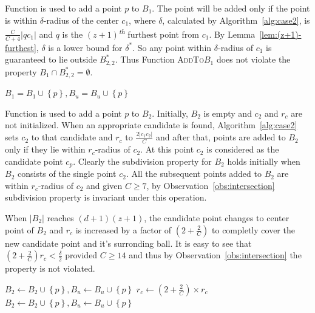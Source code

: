 \documentclass[envcountsame]{cls/cccg15}
\newcommand{\nth}{\textsuperscript{\textit{th}} }
\newcommand{\set}[1]{\left\{ #1 \right\}}
\newcommand{\card}[1]{\left|{#1}\right|}
\newcommand{\gee}{\geqslant}
\renewcommand{\ge}{\gee}
\begin{document}
Function  is used to add a point $p$ to $B_1$. The point will be added only if the point is within $\delta$\nobreakdash-radius of the center $c_1$, where $\delta$, calculated by Algorithm~\ref{alg:case2}, is $\frac{C}{C+4}\card{qc_1}$ and $q$ is the $(z+1)$\nth furthest point from $c_1$. By Lemma~\ref{lem:(z+1)-furthest}, $\delta$ is a lower bound for $\delta^*$. So any point within $\delta$-radius of $c_1$ is guaranteed to lie outside $B_{2,2}^*$. Thus Function \textsc{AddTo$B_1$} does not violate the property $B_1 \cap B_{2,2}^* = \emptyset$.
\begin{algorithmic}
		\State $B_1 = B_1 \cup \set{p}, B_u = B_u \cup \set{p}$
		\State {}
	\EndIf
	\State {}
\EndFunction
\end{algorithmic}

Function  is used to add a point $p$ to $B_2$. Initially, $B_2$ is empty and $c_2$ and $r_c$ are not initialized. When an appropriate candidate is found, Algorithm~\ref{alg:case2} sets $c_2$ to that candidate and $r_c$ to $\frac{2\card{c_1c_2}}{C}$ and after that, points are added to $B_2$ only if they lie within $r_c$-radius of $c_2$. At this point $c_2$ is considered as the candidate point $c_p$. Clearly the subdivision property for $B_2$ holds initially when $B_2$ consists of the single point $c_2$. All the subsequent points added to $B_2$ are within $r_c$-radius of $c_2$ and given $C\ge 7$, by Observation~\ref{obs:intersection} subdivision property is invariant under this operation.

When $\card{B_2}$ reaches $(d+1)(z+1)$, the candidate point changes to center point of $B_2$ and $r_c$ is increased by a factor of $(2 + \frac{2}{C})$ to completly cover the new candidate point and it's surronding ball. It is easy to see that $(2 + \frac{2}{C})r_c < \frac{\delta}{2}$ provided $C \ge 14$ and thus by Observation~\ref{obs:intersection} the property is not violated.

\begin{algorithmic}
		\State $B_2 \gets B_2 \cup \set{p}, B_u \gets B_u \cup \set{p}$
		\If{$\card{B_2} = (d+1)(z+1)$}
			\State $r_c \gets  (2 + \frac{2}{C}) \times r_c$
					\State $B_2 \gets B_2 \cup \set{p}, B_u \gets B_u \cup \set{p}$
				\EndIf
			\EndFor
		\EndIf
		\State {}
	\EndIf
	\State {}
\EndFunction
\end{algorithmic}
\end{document}
